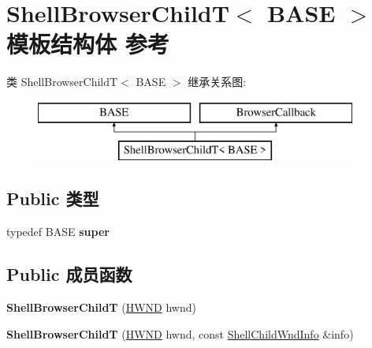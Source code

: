 \hypertarget{struct_shell_browser_child_t}{}\section{Shell\+Browser\+ChildT$<$ B\+A\+SE $>$ 模板结构体 参考}
\label{struct_shell_browser_child_t}
类 Shell\+Browser\+ChildT$<$ B\+A\+SE $>$ 继承关系图\+:\begin{figure}[H]
\begin{center}
\leavevmode
\includegraphics[height=2.000000cm]{struct_shell_browser_child_t}
\end{center}
\end{figure}
\subsection*{Public 类型}
\begin{DoxyCompactItemize}
\item 
\mbox{\label{struct_shell_browser_child_t_a199e370b438e6dd6171662ddd46f8cfc}} 
typedef B\+A\+SE {\bfseries super}
\end{DoxyCompactItemize}
\subsection*{Public 成员函数}
\begin{DoxyCompactItemize}
\item 
\mbox{\label{struct_shell_browser_child_t_a131e70f9bc9d41137cf40fc0656f2148}} 
{\bfseries Shell\+Browser\+ChildT} (\hyperlink{interfacevoid}{H\+W\+ND} hwnd)
\item 
\mbox{\label{struct_shell_browser_child_t_aa1f6889a1bf6c992f5c4a38a20fed35c}} 
{\bfseries Shell\+Browser\+ChildT} (\hyperlink{interfacevoid}{H\+W\+ND} hwnd, const \hyperlink{struct_shell_child_wnd_info}{Shell\+Child\+Wnd\+Info} \&info)
\end{DoxyCompactItemize}
